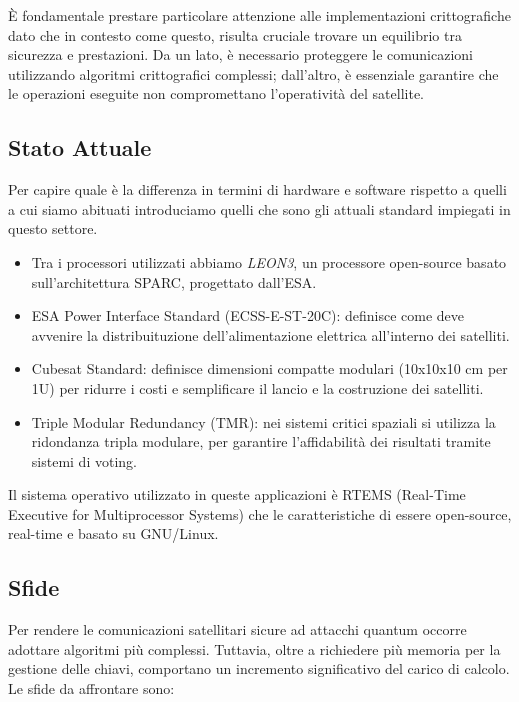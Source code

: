 \noindent
È fondamentale prestare particolare attenzione alle implementazioni 
crittogra\-fiche dato che in contesto come questo, risulta cruciale trovare un equilibrio tra
sicurezza e prestazioni. Da un lato, è necessario proteggere le comunicazioni
utilizzando algoritmi crittografici complessi; dall'altro, è essenziale
garantire che le operazioni eseguite non compromettano l'operatività del
satellite.

\subsection{Stato Attuale}

Per capire quale è la differenza in termini di hardware e software rispetto a quelli a cui siamo abituati 
introduciamo quelli che sono gli attuali standard impiegati in questo settore.

\begin{itemize}
    \item Tra i processori utilizzati abbiamo \textit{LEON3}, un processore open-source basato sull'architettura SPARC, progettato dall'ESA. 
    \item ESA Power Interface Standard (ECSS-E-ST-20C): definisce come deve avvenire la distribuituzione dell'alimentazione elettrica all'interno dei satelliti.
    \item Cubesat Standard: definisce dimensioni compatte modulari (10x10x10 cm per 1U) per ridurre i costi e semplificare il lancio e la costruzione dei satelliti.
    \item Triple Modular Redundancy (TMR): nei sistemi critici spaziali si utilizza la ridondanza tripla modulare, per garantire l'affidabilità dei risultati tramite sistemi di voting.
\end{itemize}
\noindent
Il sistema operativo utilizzato in queste applicazioni è RTEMS (Real-Time Executive for Multiprocessor Systems) che le caratteristiche di essere open-source, real-time e basato su GNU/Linux.

\subsection{Sfide}
\noindent
Per rendere le comunicazioni satellitari sicure ad attacchi quantum occorre adottare algoritmi più complessi.
Tuttavia, oltre a richiedere più memoria per la gestione delle chiavi,
comportano un incremento significativo del carico di calcolo. Le sfide da affrontare sono:

